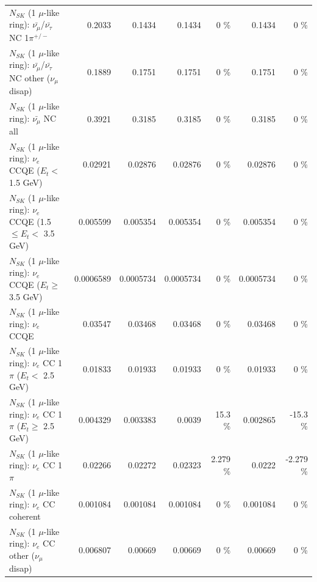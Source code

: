 \begin{table}
\begin{tabular}{| l | r | r | r  r | r  r |}
\hline
  $N_{SK}$ (1 $\mu$-like ring): $\bar{\nu_\mu}$/$\bar{\nu_\tau}$ NC 1$\pi^{+/-}$ &          0.2033 &          0.1434 &          0.1434 &        0 \%  &          0.1434 &        0 \%  \\ 
$N_{SK}$ (1 $\mu$-like ring): $\bar{\nu_\mu}$/$\bar{\nu_\tau}$ NC other ($\nu_\mu$ disap) &          0.1889 &          0.1751 &          0.1751 &        0 \%  &          0.1751 &        0 \%  \\ 
                          $N_{SK}$ (1 $\mu$-like ring): $\bar{\nu_{\mu}}$ NC all &          0.3921 &          0.3185 &          0.3185 &        0 \%  &          0.3185 &        0 \%  \\ 
\hline
\hline
\hline
                  $N_{SK}$ (1 $\mu$-like ring): $\nu_e$ CCQE ($E_{t} <$ 1.5 GeV) &         0.02921 &         0.02876 &         0.02876 &        0 \%  &         0.02876 &        0 \%  \\ 
         $N_{SK}$ (1 $\mu$-like ring): $\nu_e$ CCQE (1.5 $\leq E_{t} <$ 3.5 GeV) &        0.005599 &        0.005354 &        0.005354 &        0 \%  &        0.005354 &        0 \%  \\ 
               $N_{SK}$ (1 $\mu$-like ring): $\nu_e$ CCQE ($E_{t} \geq$ 3.5 GeV) &       0.0006589 &       0.0005734 &       0.0005734 &        0 \%  &       0.0005734 &        0 \%  \\ 
\hline
                                      $N_{SK}$ (1 $\mu$-like ring): $\nu_e$ CCQE &         0.03547 &         0.03468 &         0.03468 &        0 \%  &         0.03468 &        0 \%  \\ 
\hline
             $N_{SK}$ (1 $\mu$-like ring): $\nu_e$ CC 1$\pi$ ($E_{t} <$ 2.5 GeV) &         0.01833 &         0.01933 &         0.01933 &        0 \%  &         0.01933 &        0 \%  \\ 
          $N_{SK}$ (1 $\mu$-like ring): $\nu_e$ CC 1$\pi$ ($E_{t} \geq$ 2.5 GeV) &        0.004329 &        0.003383 &          0.0039 &     15.3 \%  &        0.002865 &    -15.3 \%  \\ 
\hline
                                 $N_{SK}$ (1 $\mu$-like ring): $\nu_e$ CC 1$\pi$ &         0.02266 &         0.02272 &         0.02323 &    2.279 \%  &          0.0222 &   -2.279 \%  \\ 
                               $N_{SK}$ (1 $\mu$-like ring): $\nu_e$ CC coherent &        0.001084 &        0.001084 &        0.001084 &        0 \%  &        0.001084 &        0 \%  \\ 
                $N_{SK}$ (1 $\mu$-like ring): $\nu_e$ CC other ($\nu_\mu$ disap) &        0.006807 &         0.00669 &         0.00669 &        0 \%  &         0.00669 &        0 \%  \\ 

\end{tabular}
\end{table}
